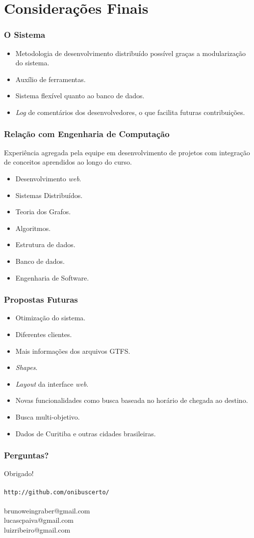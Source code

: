 \section{Considerações Finais}

\frame
{
\frametitle{O Sistema}
\begin{itemize}
	\item Metodologia de desenvolvimento distribuído possível graças a modularização do sistema.
	\item Auxílio de ferramentas.
	\item Sistema flexível quanto ao banco de dados.
	\item \emph{Log} de comentários dos desenvolvedores, o que facilita futuras contribuições.
\end{itemize}
}

\frame
{
\frametitle{Relação com Engenharia de Computação}
Experiência agregada pela equipe em desenvolvimento de projetos com integração de conceitos aprendidos ao longo do curso.
\begin{itemize}
\item Desenvolvimento \emph{web}.
\item Sistemas Distribuídos.
\item Teoria dos Grafos.
\item Algoritmos.
\item Estrutura de dados.
\item Banco de dados.
\item Engenharia de Software.
\end{itemize}
}

\frame
{
\frametitle{Propostas Futuras}
\begin{itemize}
\item Otimização do sistema.
\item Diferentes clientes.
\item Mais informações dos arquivos GTFS.
\item \emph{Shapes}.
\item \emph{Layout} da interface \emph{web}.
\item Novas funcionalidades como busca baseada no horário de chegada ao destino.
\item Busca multi-objetivo.
\item Dados de Curitiba e outras cidades brasileiras.
\end{itemize}
}

\frame
{
\frametitle{Perguntas?}
\begin{center}
\vskip15pt \Huge Obrigado! \\
~ \\
\normalsize \texttt{http://github.com/onibuscerto/} \\
~ \\
brunoweingraber@gmail.com \\
lucascpaiva@gmail.com \\
luizribeiro@gmail.com \\
\end{center}
}
